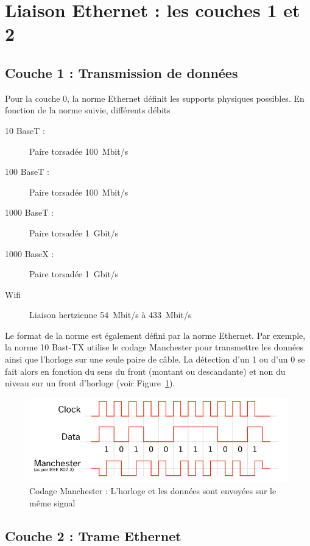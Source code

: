 \FloatBarrier
\section{Liaison Ethernet : les couches 1 et 2}
\subsection{Couche 1 : Transmission de données}
Pour la couche 0, la norme Ethernet définit les supports physiques possibles. En fonction de la norme suivie, différents débits
\begin{description}
  \item [10 BaseT : ] Paire torsadée \SI{100}{Mbit/s}
  \item [100 BaseT : ] Paire torsadée \SI{100}{Mbit/s}
  \item [1000 BaseT : ] Paire torsadée \SI{1}{Gbit/s}
  \item [1000 BaseX : ] Paire torsadée \SI{1}{Gbit/s}
  \item [Wifi] Liaison hertzienne \SI{54}{Mbit/s} à \SI{433}{Mbit/s}
\end{description}

Le format de la norme est également défini par la norme Ethernet. Par exemple, la norme 10 Bast-TX utilise le codage Manchester pour transmettre les données ainsi que l'horloge sur une seule paire de câble. La détection d'un 1 ou d'un 0 se fait alors en fonction du sens du front (montant ou descandante) et non du niveau sur un front d'horloge (voir Figure~\ref{fig:manchesterCode}).

\begin{figure}[h]
  \centering
  \includegraphics[width=.7\textwidth]{../../images/materiel/manchesterCode}
  \caption{Codage Manchester : L'horloge et les données sont envoyées sur le même signal}
  \label{fig:manchesterCode}
\end{figure}

\subsection{Couche 2 : Trame Ethernet}
